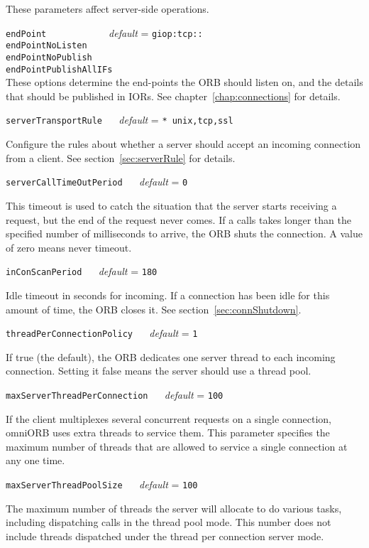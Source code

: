 \documentclass[11pt,twoside,a4paper]{book}
\makeatletter
\newcommand{\code}[1]{\texttt{#1}}
\newcommand{\confopt}[2]
  {\vspace{\baselineskip}\par\noindent\code{#1} ~~ \textit{default} =
   \code{#2}}
\renewcommand{\confopt}[2]
  {\vspace{\baselineskip}\par\noindent\code{#1} ~~ \textit{default} =
   \code{#2}\\[-1ex]\@afterheading}
\makeatother
\begin{document}
These parameters affect server-side operations.


\vspace{\baselineskip}

\noindent
\code{endPoint~~~~~~~~~} ~~ \textit{default} = \code{giop:tcp::}\\
\code{endPointNoListen}\\
\code{endPointNoPublish}\\
\code{endPointPublishAllIFs}\\[.1ex]

\noindent
These options determine the end-points the ORB should listen on, and
the details that should be published in IORs. See
chapter~\ref{chap:connections} for details.



\confopt{serverTransportRule}{* unix,tcp,ssl}

Configure the rules about whether a server should accept an incoming
connection from a client. See section~\ref{sec:serverRule} for
details.


\confopt{serverCallTimeOutPeriod}{0}

This timeout is used to catch the situation that the server starts
receiving a request, but the end of the request never comes. If a
calls takes longer than the specified number of milliseconds to
arrive, the ORB shuts the connection. A value of zero means never
timeout.


\confopt{inConScanPeriod}{180}

Idle timeout in seconds for incoming. If a connection has been idle
for this amount of time, the ORB closes it. See
section~\ref{sec:connShutdown}.


\confopt{threadPerConnectionPolicy}{1}

If true (the default), the ORB dedicates one server thread to each
incoming connection. Setting it false means the server should use a
thread pool.


\confopt{maxServerThreadPerConnection}{100}

If the client multiplexes several concurrent requests on a single
connection, omniORB uses extra threads to service them. This parameter
specifies the maximum number of threads that are allowed to service a
single connection at any one time.


\confopt{maxServerThreadPoolSize}{100}

The maximum number of threads the server will allocate to do various
tasks, including dispatching calls in the thread pool mode. This
number does not include threads dispatched under the thread per
connection server mode.
\end{document}
